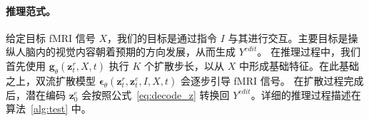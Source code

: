 \paragraph{推理范式。} 给定目标 fMRI 信号 $X$，我们的目标是通过指令 $I$ 与其进行交互。主要目标是操纵人脑内的视觉内容朝着预期的方向发展，从而生成 $Y^{edit}$。
在推理过程中，我们首先使用 $\bm{g}_\theta(\textbf{z}^r_t, X, t)$ 执行 $K$ 个扩散步长，以从 $X$ 中形成基础特征。在此基础之上，双流扩散模型 $\bm{\epsilon}_\theta(\textbf{z}^r_t, \textbf{z}^e_t, I, X, t)$ 会逐步引导 fMRI 信号。
在扩散过程完成后，潜在编码 $\textbf{z}_0^e$ 会按照公式~\ref{eq:decode_z} 转换回 $Y^{edit}$。详细的推理过程描述在算法~\ref{alg:test} 中。

